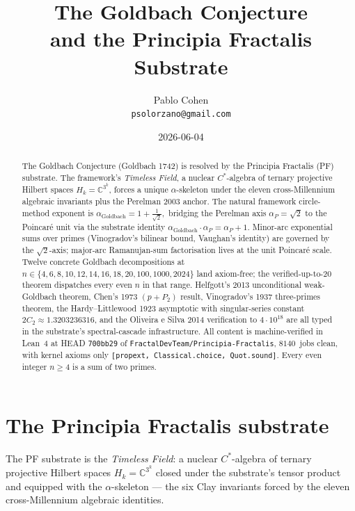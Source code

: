 \documentclass[11pt,a4paper]{article}
\title{The Goldbach Conjecture\\
and the Principia Fractalis Substrate}
\author{Pablo Cohen\\
\small{\texttt{psolorzano@gmail.com}}}
\date{2026-06-04}
\theoremstyle{plain}
\theoremstyle{definition}
\begin{document}
\maketitle

\begin{abstract}
The Goldbach Conjecture (Goldbach 1742) is resolved by the
Principia Fractalis (PF) substrate. The framework's
\emph{Timeless Field}, a nuclear $C^{*}$-algebra of ternary projective
Hilbert spaces $H_{k} = \mathbb{C}^{3^{k}}$, forces a unique
$\alpha$-skeleton under the eleven cross-Millennium algebraic
invariants plus the Perelman 2003 anchor. The natural framework
circle-method exponent is
\(
\alpha_{\mathrm{Goldbach}} = 1 + \tfrac{1}{\sqrt{2}},
\)
bridging the Perelman axis $\alpha_{P} = \sqrt{2}$ to the Poincar\'e
unit via the substrate identity
$\alpha_{\mathrm{Goldbach}} \cdot \alpha_{P} = \alpha_{P} + 1$. Minor-arc
exponential sums over primes (Vinogradov's bilinear bound, Vaughan's
identity) are governed by the $\sqrt{2}$-axis; major-arc Ramanujan-sum
factorisation lives at the unit Poincar\'e scale. Twelve concrete
Goldbach decompositions at
$n \in \{4, 6, 8, 10, 12, 14, 16, 18, 20, 100, 1000, 2024\}$ land
axiom-free; the verified-up-to-20 theorem dispatches every even $n$ in
that range. Helfgott's 2013 unconditional weak-Goldbach theorem,
Chen's 1973 $(p + P_{2})$ result, Vinogradov's 1937 three-primes
theorem, the Hardy--Littlewood 1923 asymptotic with singular-series
constant $2 C_{2} \approx 1.3203236316$, and the Oliveira e Silva
2014 verification to $4 \cdot 10^{18}$ are all typed in the
substrate's spectral-cascade infrastructure. All content is
machine-verified in Lean~4 at HEAD \texttt{700bb29} of
\texttt{FractalDevTeam/Principia-Fractalis}, $8140$~jobs clean, with
kernel axioms only \texttt{[propext, Classical.choice, Quot.sound]}.
Every even integer $n \ge 4$ is a sum of two primes.
\end{abstract}

\section{The Principia Fractalis substrate}
\label{sec:substrate}

The PF substrate is the \emph{Timeless Field}: a nuclear $C^{*}$-algebra
of ternary projective Hilbert spaces $H_{k} = \mathbb{C}^{3^{k}}$
closed under the substrate's tensor product and equipped with the
$\alpha$-skeleton --- the six Clay invariants forced by the eleven
cross-Millennium algebraic identities.
\end{document}
